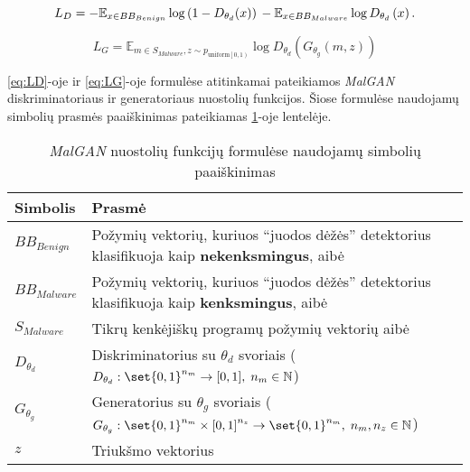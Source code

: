 \begin{equation}
    L_{D}= -\mathbb{E}_{x\in BB_{Benign}}\log\left(1-D_{\theta_{d}}(x)\right)\\-\mathbb{E}_{x\in BB_{Malware}}\log D_{\theta_{d}}\left(x\right).\label{eq:LD}
\end{equation}

\begin{equation}
    L_G= \mathbb{E}_{m \in S_{Malware},z \sim p_{\mathrm{uniform} \left[0,1\right) }} \log D_{\theta_d} \left(G_{\theta_g} \left(m,z\right) \right)\label{eq:LG}
\end{equation}

\ref{eq:LD}-oje ir \ref{eq:LG}-oje formulėse atitinkamai pateikiamos \textit{MalGAN} diskriminatoriaus ir generatoriaus nuostolių funkcijos. Šiose formulėse naudojamų simbolių prasmės paaiškinimas pateikiamas \ref{tab:eq_explain}-oje lentelėje.

\begin{table}[h]
    \begin{small}
        \caption{\textit{MalGAN} nuostolių funkcijų formulėse naudojamų simbolių paaiškinimas}\label{tab:eq_explain}
        \begin{center}
            \begin{tabular}[c]{l|p{}}
                Simbolis       & Prasmė                                                                                                                                           \\
                \midrule
                $BB_{Benign}$  & Požymių vektorių, kuriuos \enquote{juodos dėžės} detektorius klasifikuoja kaip \textbf{nekenksmingus}, aibė                                      \\

                $BB_{Malware}$ & Požymių vektorių, kuriuos \enquote{juodos dėžės} detektorius klasifikuoja kaip \textbf{kenksmingus}, aibė                                        \\

                $S_{Malware}$  & Tikrų kenkėjiškų programų požymių vektorių aibė                                                                                                  \\

                $D_{\theta_d}$ & Diskriminatorius su $\theta_d$ svoriais ($D_{\theta_d}: \set{0,1}^{n_m} \rightarrow [0,1], \; n_m \in \mathbb{N}$)                               \\

                $G_{\theta_g}$ & Generatorius su $\theta_g$ svoriais ($G_{\theta_g}: \set{0,1}^{n_m} \times {[0,1]}^{n_z} \rightarrow \set{0,1}^{n_m}, \; n_m, n_z \in \mathbb{N}$) \\

                $z$            & Triukšmo vektorius                                                                                                                               \\

            \end{tabular}
        \end{center}
    \end{small}
\end{table}

